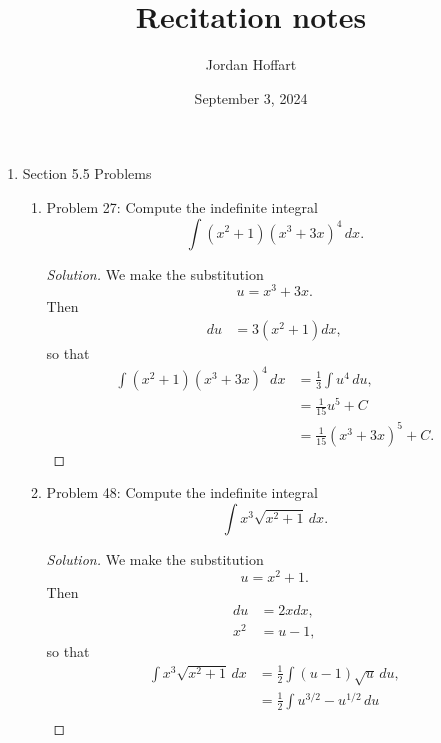 \documentclass{article}
\title{Recitation notes}
\author{Jordan Hoffart}
\date{September 3, 2024}
\theoremstyle{plain}
\theoremstyle{definition}
\begin{document}
\maketitle
\begin{enumerate}
  \item Section 5.5 Problems
    \begin{enumerate}
      \item Problem 27: Compute the indefinite integral
        \begin{equation}
          \int (x^2+1)(x^3+3x)^4\,dx.
        \end{equation}
        \begin{proof}[Solution]
          We make the substitution
          \begin{equation}
            u = x^3 + 3x.
          \end{equation}
          Then
          \begin{align}
            du & = 3(x^2+1) dx,
          \end{align}
          so that
          \begin{align}
            \int (x^2+1)(x^3+3x)^4\,dx & = \frac{1}{3} \int u^4\,du,   \\
                                       & = \frac{1}{15}u^5 + C         \\
                                       & = \frac{1}{15}(x^3+3x)^5 + C.
          \end{align}
        \end{proof}
      \item Problem 48: Compute the indefinite integral
        \begin{equation}
          \int x^3\sqrt{x^2+1}\,dx.
        \end{equation}
        \begin{proof}[Solution]
          We make the substitution
          \begin{equation}
            u = x^2 + 1.
          \end{equation}
          Then
          \begin{align}
            du  & = 2x dx, \\
            x^2 & = u-1,
          \end{align}
          so that
          \begin{align}
            \int x^3\sqrt{x^2+1}\,dx & = \frac{1}{2}\int (u-1)\sqrt{u}\,du,                                               \\
                                     & = \frac{1}{2}\int u^{3/2} - u^{1/2}\,du                                            \\

\end{align}
\end{proof}
\end{enumerate}
\end{enumerate}
\end{document}
